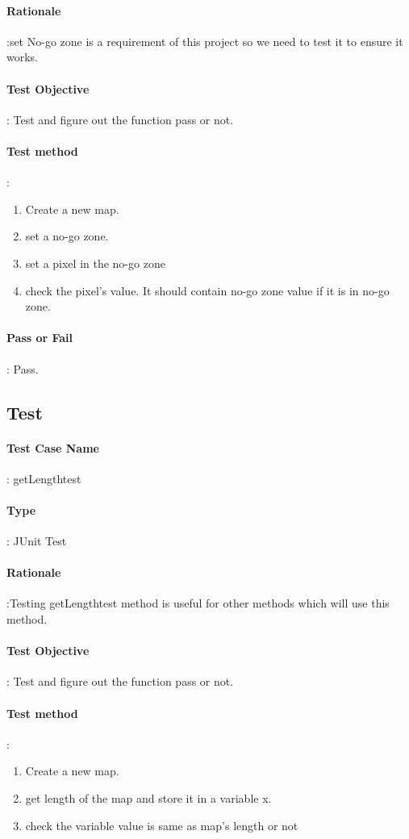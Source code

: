\documentclass[12pt, a4paper]{report}
\begin{document}
\paragraph{Rationale}:set No-go zone is a requirement of this project so we need to test it to ensure it works.
\paragraph{Test Objective}: Test and figure out the function pass or not.
\paragraph{Test method}: 
\begin{enumerate}
	\item Create a new map.
	\item set a no-go zone.
	\item set a pixel in the no-go zone
	\item check the pixel's value. It should contain no-go zone value if it is in no-go zone.
\end{enumerate}
\paragraph{Pass or Fail}: Pass.

\addtocounter{casecounter}{1}
\subsection{Test }
\paragraph{Test Case Name}: getLengthtest
\paragraph{Type}: JUnit Test
\paragraph{Rationale}:Testing getLengthtest method is useful for other methods which will use this method.
\paragraph{Test Objective}: Test and figure out the function pass or not.
\paragraph{Test method}: 
\begin{enumerate}
	\item Create a new map.
	\item get length of the map and store it in a variable x.
	\item check the variable value is same as map's length or not
\end{enumerate}
\end{document}
